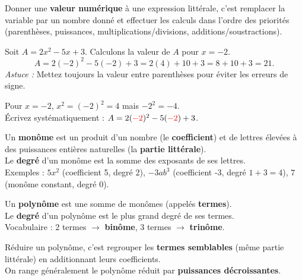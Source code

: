 \documentclass[11pt]{article}
\newcounter{popsec}
\newcounter{popsub}
\newcommand{\courssub}[1]{%
  \stepcounter{popsub}%
  \par\vspace{9pt}\noindent{\popxbold\fontsize{11.5}{13}\selectfont\color{popink}{\color{poporange}\thepopsec.\thepopsub}\hspace{6pt}#1}\par\nopagebreak\vspace{4pt}
}
\begin{document}
\begin{definition}
Donner une \textbf{valeur numérique} à une expression littérale, c'est remplacer la variable par un nombre donné et effectuer les calculs dans l'ordre des priorités (parenthèses, puissances, multiplications/divisions, additions/soustractions).
\end{definition}

\begin{exemplebox}
Soit $A = 2x^2 - 5x + 3$. Calculons la valeur de $A$ pour $x = -2$.
\[
A = 2(-2)^2 - 5(-2) + 3 = 2(4) + 10 + 3 = 8 + 10 + 3 = 21.
\]
\emph{Astuce :} Mettez toujours la valeur entre parenthèses pour éviter les erreurs de signe.
\end{exemplebox}

\begin{attention}
Pour $x = -2$, $x^2 = (-2)^2 = 4$ mais $-2^2 = -4$.\\
Écrivez systématiquement : $A = 2(\textcolor{red}{-2})^2 - 5(\textcolor{red}{-2}) + 3$.
\end{attention}

\courssub{Monômes et polynômes}

\begin{definition}[Monôme]
Un \textbf{monôme} est un produit d'un nombre (le \textbf{coefficient}) et de lettres élevées à des puissances entières naturelles (la \textbf{partie littérale}).\\
Le \textbf{degré} d'un monôme est la somme des exposants de ses lettres.\\
Exemples : $5x^2$ (coefficient 5, degré 2), $-3ab^3$ (coefficient -3, degré $1+3=4$), $7$ (monôme constant, degré 0).
\end{definition}

\begin{definition}[Polynôme]
Un \textbf{polynôme} est une somme de monômes (appelés \textbf{termes}).\\
Le \textbf{degré} d'un polynôme est le plus grand degré de ses termes.\\
Vocabulaire : 2 termes $\rightarrow$ \textbf{binôme}, 3 termes $\rightarrow$ \textbf{trinôme}.
\end{definition}

\begin{propriete}
Réduire un polynôme, c'est regrouper les \textbf{termes semblables} (même partie littérale) en additionnant leurs coefficients.\\
On range généralement le polynôme réduit par \textbf{puissances décroissantes}.
\end{propriete}
\end{document}
